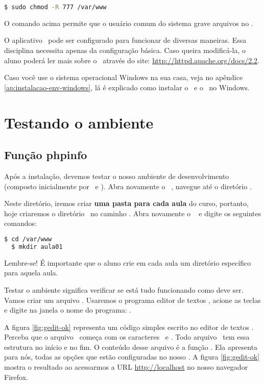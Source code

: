 \begin{lstlisting}[language=bash,style=codigos]
  $ sudo chmod -R 777 /var/www 
\end{lstlisting}

O comando acima permite que o usuário comum do sistema grave arquivos no \dirpadrao.

O aplicativo \apache~pode ser configurado para funcionar de diversas maneiras. 
Essa disciplina necessita apenas da configuração básica. Caso queira modificá-la, 
o aluno poderá ler mais sobre o \apache~através do site: \url{http://httpd.apache.org/docs/2.2}.

Caso você use o sistema operacional Windows na sua casa, veja no apêndice 
\ref{ap:instalacao-env-windows}, lá é explicado como instalar o \php~e o \apache~no Windows.


\section{Testando o ambiente}
\label{testando-ambiente}

\subsection{Função phpinfo}
\label{subsection:funcao-phpinfo}

Após a instalação, devemos testar o nosso ambiente de desenvolvimento (composto
inicialmente por \php~e \apache). Abra novamente o \terminal~, navegue até o
diretório \dirpadrao.

Neste diretório, iremos criar \textbf{uma pasta para cada aula} do curso, portanto, hoje
criaremos o diretório ~no caminho \dirpadrao. Abra novamente o \terminal~
e digite os seguintes comandos:

\begin{lstlisting}[language=bash,style=codigos]
  $ cd /var/www 
  $ mkdir aula01
\end{lstlisting}

Lembre-se! É importante que o aluno crie em cada aula um diretório 
específico para aquela aula.

Testar o ambiente significa verificar se está tudo funcionando como deve ser. Vamos criar um 
arquivo \phpextensao. Usaremos o programa editor de textos \gedit, acione as teclas \altfdois 
e digite na janela o nome do programa: \gedit. 

A figura \ref{fig:gedit-ok} representa um código simples escrito no editor de textos \gedit. 
Perceba que o arquivo \phpextensao~começa com os caracteres \phpinicio~e \phpfim. 
Todo arquivo \phpextensao~tem essa estrutura no início e no fim. O conteúdo desse arquivo é 
a função \funcaophpinfo. Ela apresenta para nós, todas as opções que estão configuradas no 
nosso \php. A figura \ref{fig:gedit-ok} mostra o resultado ao acessarmos a URL \url{http://localhost} 
no nosso navegador Firefox.

